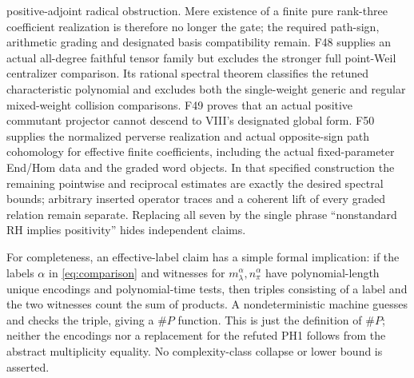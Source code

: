 positive-adjoint radical obstruction. Mere existence of a finite
pure rank-three coefficient realization is therefore no longer
the gate; the required path-sign, arithmetic grading and
designated basis compatibility remain. F48 supplies an actual all-degree faithful tensor family but excludes the stronger full point-Weil centralizer comparison. Its rational spectral theorem classifies the retuned characteristic polynomial and excludes both the single-weight generic and regular mixed-weight collision comparisons. F49 proves that an actual positive commutant projector cannot descend to VIII's designated global form. F50 supplies the normalized perverse realization and actual opposite-sign path cohomology for effective finite coefficients, including the actual fixed-parameter End/Hom data and the graded word objects. In that specified construction the remaining pointwise and reciprocal estimates are exactly the desired spectral bounds; arbitrary inserted operator traces and a coherent lift of every graded relation remain separate. Replacing all seven by the single phrase ``nonstandard RH implies positivity'' hides independent claims.

For completeness, an effective-label claim has a simple formal implication: if the labels $\alpha$ in \eqref{eq:comparison} and witnesses for $m_\lambda^\alpha,n_\pi^\alpha$ have polynomial-length unique encodings and polynomial-time tests, then triples consisting of a label and the two witnesses count the sum of products. A nondeterministic machine guesses and checks the triple, giving a \(\#P\) function. This is just the definition of \(\#P\); neither the encodings nor a replacement for the refuted PH1 follows from the abstract multiplicity equality. No complexity-class collapse or lower bound is asserted.

